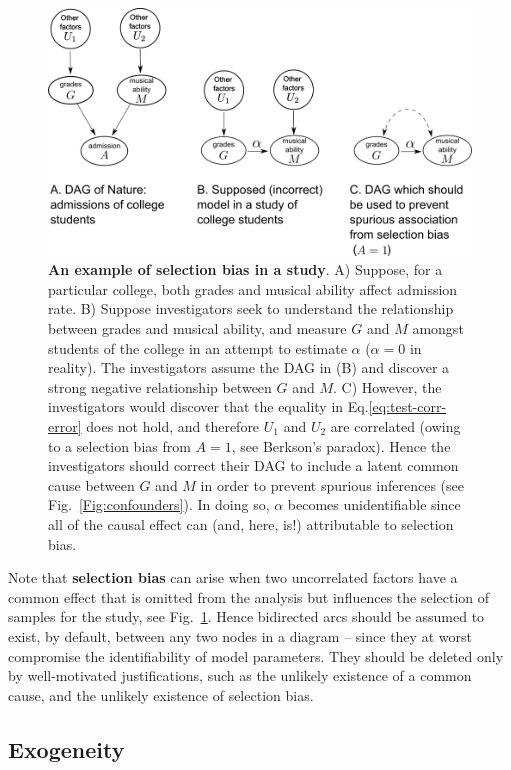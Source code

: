 \documentclass[11pt]{article}
\numberwithin{equation}{section}
\begin{document}
\begin{figure}
\begin{center}
\includegraphics[width=0.8\columnwidth]{figures/selection-bias.png}  
\end{center}
\caption{\textbf{An example of selection bias in a study}. A) Suppose, for a particular college, both grades and musical ability affect admission rate. B) Suppose investigators seek to understand the relationship between grades and musical ability, and measure $G$ and $M$ amongst students of the college in an attempt to estimate $\alpha$ ($\alpha=0$ in reality). The investigators assume the DAG in (B) and discover a strong negative relationship between $G$ and $M$. C) However, the investigators would discover that the equality in Eq.\eqref{eq:test-corr-error} does not hold, and therefore $U_1$ and $U_2$ are correlated (owing to a selection bias from $A=1$, see Berkson's paradox). Hence the investigators should correct their DAG to include a latent common cause between $G$ and $M$ in order to prevent spurious inferences (see Fig.~\ref{Fig:confounders}). In doing so, $\alpha$ becomes unidentifiable since all of the causal effect can (and, here, is!) attributable to selection bias.}
\label{Fig:selection-bias}
\end{figure}

Note that \textbf{selection bias} can arise when two uncorrelated factors have a common effect that is omitted from the analysis but influences the selection of samples for the study, see Fig.~\ref{Fig:selection-bias}. Hence bidirected arcs should be assumed to exist, by default, between any two nodes in a diagram -- since they at worst compromise the identifiability of model parameters. They should be deleted only by well-motivated justifications, such as the unlikely existence of a common cause, and the unlikely existence of selection bias.

\subsection{Exogeneity} \label{sec:exogeneity}
\end{document}
